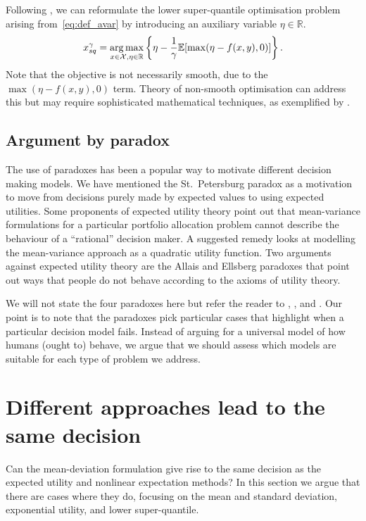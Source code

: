 \documentclass[main.tex]{subfiles}
\begin{document}
\begin{example}
  Following \citet{ben2007old}, we can reformulate the lower
  super-quantile optimisation problem arising from~\eqref{eq:def_avar}
  by introducing an auxiliary variable $\eta\in\mathbb{R}$.
  \begin{equation}\label{eq:opt_avar}
    x_{sq}^{\gamma}
    =\operatorname*{arg\,max}_{x\in\mathcal{X},\eta\in\mathbb{R}}
    \left\{\eta - \frac{1}{\gamma}\mathbb{E}[\max(\eta-f(x,y),0)]\right\}.
  \end{equation}
  Note that the objective is not necessarily smooth, due to the
  $\max(\eta-f(x,y),0)$ term. Theory of non-smooth optimisation
  can address this but may require sophisticated mathematical techniques, as
  exemplified by \citet{kouri2016risk}.
\end{example}


\subsection{Argument by paradox}
The use of paradoxes has been a popular way to motivate different
decision making models. We have mentioned the St.~Petersburg paradox
as a motivation to move from decisions purely made by expected values
to using expected utilities.  Some proponents of expected utility
theory point out that mean-variance formulations for a particular
portfolio allocation problem cannot describe the behaviour of a
``rational'' decision maker. A suggested remedy looks at modelling the
mean-variance approach as a quadratic utility function.  Two arguments
against expected utility theory are the Allais and Ellsberg paradoxes
that point out ways that people do not behave according to the axioms
of utility theory.

We will not state the four paradoxes here but refer the reader to
\citet{ellsberg1961risk}, \citet{follmer2004stochastic}, and
\citet{johnstone2013mean}.  Our point is to note that the
paradoxes pick particular cases that highlight when a particular
decision model fails. Instead of arguing for a universal model of how
humans (ought to) behave, we argue that we should assess which models
are suitable for each type of problem we address.


\section{Different approaches lead to the same decision}\label{sec:one_comparison_orderings}
Can the mean-deviation formulation give rise to the same decision
as the expected utility and nonlinear expectation methods?
In this section we argue that there are cases where they do,
focusing on the mean and standard deviation, exponential
utility, and lower super-quantile.
\end{document}

